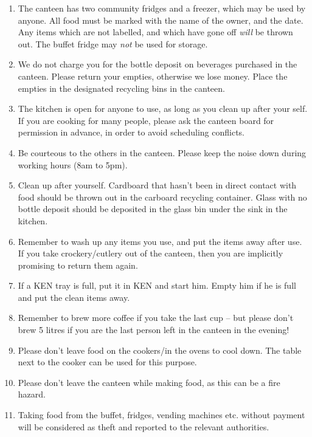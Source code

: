 \large
\begin{enumerate}
\item The canteen has two community fridges and a freezer, which may be used by anyone.  All food must be marked with the name of the owner, and the date. Any items which are not labelled, and which have gone off \textit{will} be thrown out. The buffet fridge may \textit{not} be used for storage.
\item We do not charge you for the bottle deposit on beverages purchased in the canteen. Please return your empties, otherwise we lose money. Place the empties in the designated recycling bins in the canteen. 
\item The kitchen is open for anyone to use, as long as you clean up after your self. If you are cooking for many people, please ask the canteen board for permission in advance, in order to avoid scheduling conflicts.
\item Be courteous to the others in the canteen. Please keep the noise down during working hours (8am to 5pm).
\item Clean up after yourself. Cardboard that hasn't been in direct contact with food should be thrown out in the carboard recycling container. Glass with no bottle deposit should be deposited in the glass bin under the sink in the kitchen.
\item Remember to wash up any items you use, and put the items away after use. If you take crockery/cutlery out of the canteen, then you are implicitly promising to return them again.
\item If a KEN tray is full, put it in KEN and start him. Empty him if he is full and put the clean items away.
\item Remember to brew more coffee if you take the last cup -- but please don't brew 5 litres if you are the last person left in the canteen in the evening!
\item Please don't leave food on the cookers/in the ovens to cool down. The table next to the cooker can be used for this purpose.
\item Please don't leave the canteen while making food, as this can be a fire hazard.
\item Taking food from the buffet, fridges, vending machines etc. without payment will be considered as theft and reported to the relevant authorities.
\end{enumerate}
